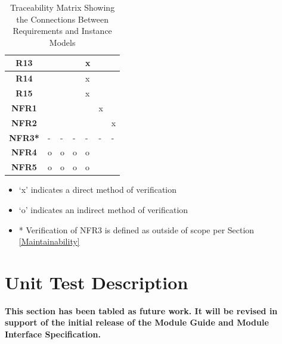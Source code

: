 \documentclass[12pt, titlepage]{article}
\begin{document}
\begin{table}[h!]
\begin{tabularx}{\textwidth}{|c|X|X|X|X|X|X|}
  \textbf{R13}  &                     &                     &                     & x                   &                     &                     \\ \hline
  \textbf{R14}  &                     &                     &                     & x                   &                     &                     \\ \hline
  \textbf{R15}  &                     &                     &                     & x                   &                     &                     \\ \hline
  \textbf{NFR1} &                     &                     &                     &                     & x                   &                     \\ \hline
  \textbf{NFR2} &                     &                     &                     &                     &                     & x                   \\ \hline
  \textbf{NFR3*}& -                    & -                   & -                   & -                   & -                   & -                   \\ \hline
  \textbf{NFR4} & o                   & o                   & o                   & o                   &                     &                     \\ \hline
  \textbf{NFR5} & o                   & o                   & o                   & o                   &                     &                     \\ \hline
  \end{tabularx}
  \caption{Traceability Matrix Showing the Connections Between Requirements and Instance Models}
  \label{Table_R_trace}
\end{table}

\begin{itemize}
\item \lq x\rq{} indicates a direct method of verification
\item \lq o\rq{} indicates an indirect method of verification
\item * Verification of NFR3 is defined as outside of scope per Section \ref{Maintainability}
\end{itemize}


\section{Unit Test Description}\label{UTD}
\textbf{This section has been tabled as future work. It will be revised in support of the 
initial release of the Module Guide and Module Interface Specification.}\\ \\
\end{document}
